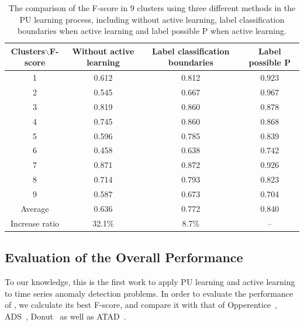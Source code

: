 \begin{table}
\caption{The comparison of the F-score in 9 clusters using three different methods in the PU learning process, including without active learning, label classification boundaries when active learning and label possible P when active learning.}
\label{table:difference_active}
\begin{center}
\begin{tabular}{| c | c | c | c |}
\hline
\textbf{Clusters$\backslash$F-score} & \textbf{Without active learning} & \textbf{Label classification boundaries} & \textbf{Label possible P} \\ \hline
1 & 0.612	& 0.812 &	0.923 \\ \hline
2 & 0.545	& 0.667 &	0.967 \\ \hline
3 & 0.819   & 0.860 &   0.878 \\ \hline
4 & 0.745   & 0.860 &	0.868 \\ \hline
5 & 0.596   & 0.785 &	0.839 \\ \hline
6 & 0.458	& 0.638 &   0.742 \\ \hline
7 & 0.871   & 0.872 &	0.926 \\ \hline
8 & 0.714	& 0.793 &   0.823 \\ \hline
9 & 0.587   & 0.673 &	0.704 \\ \hline
Average & 0.636 & 0.772 & 0.840 \\ \hline
Increase ratio & 32.1\% & 8.7\% & --\\ \hline
\end{tabular}
\end{center}
\vspace{0 mm}
\end{table}

\subsection{Evaluation of the Overall Performance}
\label{Evaluation of the Overall Performance}
To our knowledge, this is the first work to apply PU learning and active learning to time series anomaly detection problems. In order to evaluate the performance of \name{}, we calculate its best F-score, and compare it with that of Opperentice~\cite{liu2015opprentice}, ADS~\cite{ADSarticle}, Donut~\cite{xu2018unsupervised} as well as ATAD~\cite{atad}.


